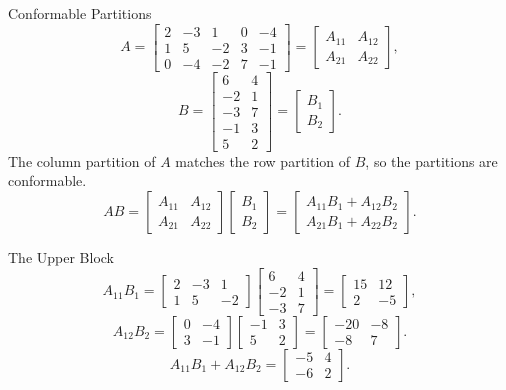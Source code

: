 \begin{frame}[shrink=3]{Conformable Partitions}
\[
A=\left[\begin{array}{ccc|cc}
2&-3&1&0&-4\\
1&5&-2&3&-1\\ \hline
0&-4&-2&7&-1
\end{array}\right]
=\begin{bmatrix}A_{11}&A_{12}\\A_{21}&A_{22}\end{bmatrix},
\]
\[
B=\left[\begin{array}{cc}6&4\\-2&1\\-3&7\\ \hline -1&3\\5&2\end{array}\right]
=\begin{bmatrix}B_1\\B_2\end{bmatrix}.
\]
The column partition of $A$ matches the row partition of $B$, so the partitions are conformable.
\pause
\[
AB=
\begin{bmatrix}A_{11}&A_{12}\\A_{21}&A_{22}\end{bmatrix}
\begin{bmatrix}B_1\\B_2\end{bmatrix}
=\begin{bmatrix}
A_{11}B_1+A_{12}B_2\\
A_{21}B_1+A_{22}B_2
\end{bmatrix}.
\]
\end{frame}

\begin{frame}{The Upper Block}
\small
\[
A_{11}B_1=
\begin{bmatrix}2&-3&1\\1&5&-2\end{bmatrix}
\begin{bmatrix}6&4\\-2&1\\-3&7\end{bmatrix}
=\begin{bmatrix}15&12\\2&-5\end{bmatrix},
\]
\pause
\[
A_{12}B_2=
\begin{bmatrix}0&-4\\3&-1\end{bmatrix}
\begin{bmatrix}-1&3\\5&2\end{bmatrix}
=\begin{bmatrix}-20&-8\\-8&7\end{bmatrix}.
\]
\pause
\[
A_{11}B_1+A_{12}B_2=\begin{bmatrix}-5&4\\-6&2\end{bmatrix}.
\]
\end{frame}


